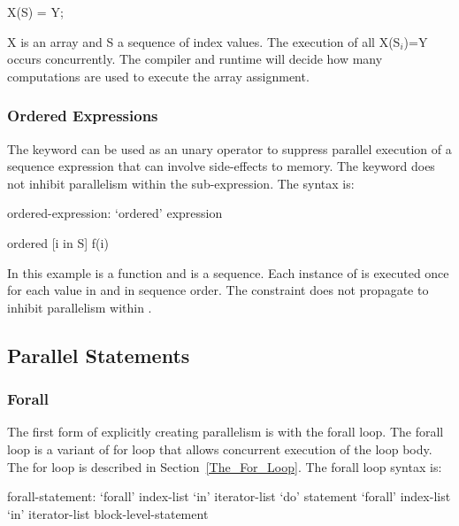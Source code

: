 \begin{example}
\begin{chapel}
X(S) = Y;
\end{chapel}
X is an array and S a sequence of index values. The execution of all X(S$_i$)=Y
occurs concurrently. The compiler and runtime will decide how many computations
are used to execute the array assignment.
\end{example}


\subsubsection{Ordered Expressions}
\label{Ordered_Expressions}

The  keyword can be used as an unary operator to
suppress parallel execution of a sequence expression that can involve
side-effects to memory. The  keyword does not inhibit
parallelism within the sub-expression. The syntax is:
\begin{syntax}
ordered-expression:
   `ordered' expression
\end{syntax}

\begin{example}
\begin{chapel}
ordered [i in S] f(i) 
\end{chapel}
In this example  is a function and  is a
sequence. Each instance of  is executed once for each value
in  and in sequence order. The  constraint does
not propagate to inhibit parallelism within .
\end{example}

\subsection{Parallel Statements}
\label{Parallel_Statements}



\subsubsection{Forall}
\label{Forall}

The first form of explicitly creating parallelism is with the forall
loop. The forall loop is a variant of for loop that allows concurrent
execution of the loop body. The for loop is described in
Section~\ref{The_For_Loop}. The forall loop syntax is:
\begin{syntax}
forall-statement:
   `forall' index-list `in' iterator-list `do' statement
   `forall' index-list `in' iterator-list block-level-statement
\end{syntax}

